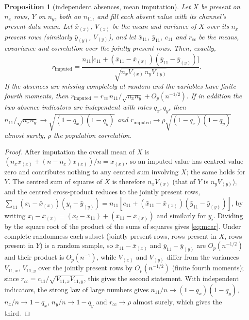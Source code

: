 \documentclass[11pt]{article}
\newtheorem{proposition}[theorem]{Proposition}
\theoremstyle{definition}\newtheorem{definition}[theorem]{Definition}
\theoremstyle{remark}\newtheorem{remark}[theorem]{Remark}
\begin{document}
\begin{proposition}[independent absences, mean imputation]\label{prop:mcar}
Let $X$ be present on $n_x$ rows, $Y$ on $n_y$, both on $n_{11}$, and fill each absent value with its channel's present-data mean. Let $\bar x_{(x)}$, $V_{(x)}$ be the mean and variance of $X$ over its $n_x$ present rows (similarly $\bar y_{(y)}$, $V_{(y)}$), and let $\bar x_{11}$, $\bar y_{11}$, $c_{11}$ and $r_{cc}$ be the means, covariance and correlation over the jointly present rows. Then, exactly,
\begin{equation}\label{eq:mcar}
r_{\mathrm{imputed}}=\frac{n_{11}\bigl[c_{11}+(\bar x_{11}-\bar x_{(x)})(\bar y_{11}-\bar y_{(y)})\bigr]}{\sqrt{n_xV_{(x)}\,n_yV_{(y)}}} .
\end{equation}
If the absences are missing completely at random \cite{LittleRubin} and the variables have finite fourth moments, then $r_{\mathrm{imputed}}=r_{cc}\,n_{11}/\sqrt{n_xn_y}+O_p(n^{-1/2})$. If in addition the two absence indicators are independent with rates $q_x,q_y$, then $n_{11}/\sqrt{n_xn_y}\to\sqrt{(1-q_x)(1-q_y)}$ and $r_{\mathrm{imputed}}\to\rho\sqrt{(1-q_x)(1-q_y)}$ almost surely, $\rho$ the population correlation.
\end{proposition}
\begin{proof}
After imputation the overall mean of $X$ is $(n_x\bar x_{(x)}+(n-n_x)\bar x_{(x)})/n=\bar x_{(x)}$, so an imputed value has centred value zero and contributes nothing to any centred sum involving $X$; the same holds for $Y$. The centred sum of squares of $X$ is therefore $n_xV_{(x)}$ (that of $Y$ is $n_yV_{(y)}$), and the centred cross-product reduces to the jointly present rows, $\sum_{11}(x_i-\bar x_{(x)})(y_i-\bar y_{(y)})=n_{11}[c_{11}+(\bar x_{11}-\bar x_{(x)})(\bar y_{11}-\bar y_{(y)})]$, by writing $x_i-\bar x_{(x)}=(x_i-\bar x_{11})+(\bar x_{11}-\bar x_{(x)})$ and similarly for $y_i$. Dividing by the square root of the product of the sums of squares gives \eqref{eq:mcar}. Under complete randomness each subset (jointly present rows, rows present in $X$, rows present in $Y$) is a random sample, so $\bar x_{11}-\bar x_{(x)}$ and $\bar y_{11}-\bar y_{(y)}$ are $O_p(n^{-1/2})$ and their product is $O_p(n^{-1})$, while $V_{(x)}$ and $V_{(y)}$ differ from the variances $V_{11,x}$, $V_{11,y}$ over the jointly present rows by $O_p(n^{-1/2})$ (finite fourth moments); since $r_{cc}=c_{11}/\sqrt{V_{11,x}V_{11,y}}$, this gives the second statement. With independent indicators, the strong law of large numbers gives $n_{11}/n\to(1-q_x)(1-q_y)$, $n_x/n\to1-q_x$, $n_y/n\to1-q_y$ and $r_{cc}\to\rho$ almost surely, which gives the third.
\end{proof}
\end{document}
